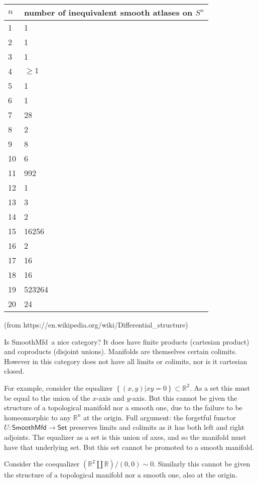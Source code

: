 \documentclass[12pt]{article}
\newcommand{\rr}{\ensuremath{\mathbb{R}}}
\newcommand{\smfd}{\textsf{SmoothMfd}}
\newcommand{\setcat}{\textsf{Set}}
\begin{document}
\begin{center}
\label{table:smoothspheres}
\begin{tabular}{|l|p{4cm}|}
\hline
$n$ & number of inequivalent smooth atlases on $S^n$ \\ \hline
1 & 1 \\ \hline
2 & 1 \\ \hline
3 & 1 \\ \hline
4 & $\geq 1$ \\ \hline
5 & 1 \\ \hline
6 & 1 \\ \hline
7 & 28 \\ \hline
8 & 2 \\ \hline
9 & 8 \\ \hline
10 & 6  \\ \hline
11 & 992  \\ \hline
12 & 1 \\ \hline
13 & 3 \\ \hline
14 & 2 \\ \hline
15 & 16256 \\ \hline
16 & 2 \\ \hline
17 & 16 \\ \hline
18 & 16 \\ \hline
19 & 523264 \\ \hline
20 & 24 \\ \hline
\end{tabular}

(from https://en.wikipedia.org/wiki/Differential\_structure)
\end{center}

Is \smfd\ a nice category? It does have finite products (cartesian product) and coproducts (disjoint unions). Manifolds are themselves certain colimits. However in this category does not have all limits or colimits, nor is it cartesian closed.

For example, consider the equalizer $\left\{(x, y) | xy = 0\right\}\subset \rr^2$. As a set this must be equal to the union of the $x$-axis and $y$-axis. But this cannot be given the structure of a topological manifold nor a smooth one, due to the failure to be homeomorphic to any $\rr^n$ at the origin. Full argument: the forgetful functor $U:\smfd\to\setcat$ preserves limits and colimits as it has both left and right adjoints. The equalizer as a set is this union of axes, and so the manifold must have that underlying set. But this set cannot be promoted to a smooth manifold.

Consider the coequalizer $\left(\mathbb{R}^2 \coprod \mathbb{R}\right)/(0,0)\sim 0$. Similarly this cannot be given the structure of a topological manifold nor a smooth one, also at the origin.
\end{document}
